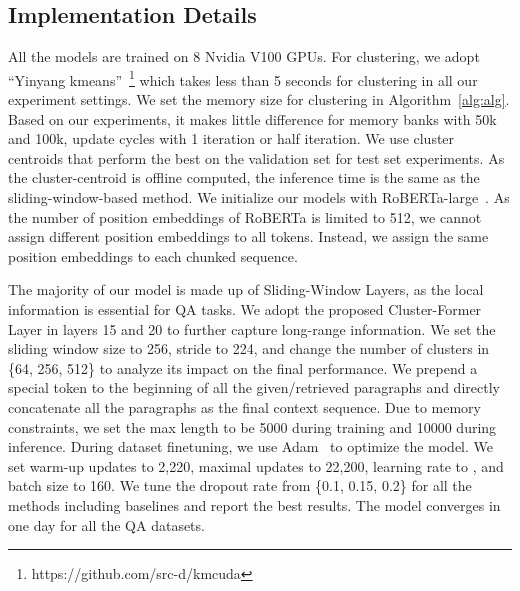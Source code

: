 \subsection{Implementation Details}
All the models are trained on 8 Nvidia V100 GPUs. 
For clustering, we adopt ``Yinyang kmeans''~\citep{ding2015yinyang}\footnote{https://github.com/src-d/kmcuda} which takes less than 5 seconds for clustering in all our experiment settings.
We set the memory size for clustering   in Algorithm~\ref{alg:alg}.
Based on our experiments, it makes little difference for memory banks with 50k and 100k, update cycles with 1 iteration or half iteration.
We use cluster centroids that perform the best on the validation set for test set experiments.
As the cluster-centroid is offline computed, the inference time is the same as the sliding-window-based method.
We initialize our models with RoBERTa-large~\citep{roberta}.
As the number of position embeddings of RoBERTa is limited to 512, we cannot assign different position embeddings to all tokens.
Instead, we assign the same position embeddings to each chunked sequence.

The majority of our model is made up of Sliding-Window Layers, as the local information is essential for QA tasks. We adopt the proposed Cluster-Former Layer in layers 15 and 20 to further capture long-range information.
We set the sliding window size  to 256, stride  to 224, and change the number of clusters in \{64, 256, 512\} to analyze its impact on the final performance.
We prepend a special token to the beginning of all the given/retrieved paragraphs and directly concatenate all the paragraphs as the final context sequence.
Due to memory constraints, we set the max length to be 5000 during training and 10000 during inference.
During dataset finetuning, we use Adam~\citep{kingma2014adam} to optimize the model. We set warm-up updates to 2,220, maximal updates to 22,200, learning rate to , and batch size to 160.
We tune the dropout rate from \{0.1, 0.15, 0.2\} for all the methods including baselines and report the best results.
The model converges in one day for all the QA datasets.

